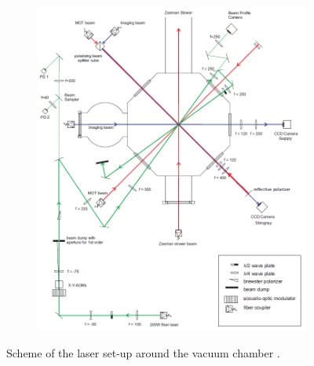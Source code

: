 \begin{figure}[h]
\centering
\begin{subfigure}[b]{0.8\textwidth}
                \includegraphics[width=\textwidth]{scheme}
\end{subfigure}
\caption{Scheme of the laser set-up around the vacuum chamber \cite{lompe}. }
\label{scheme}
\end{figure}

